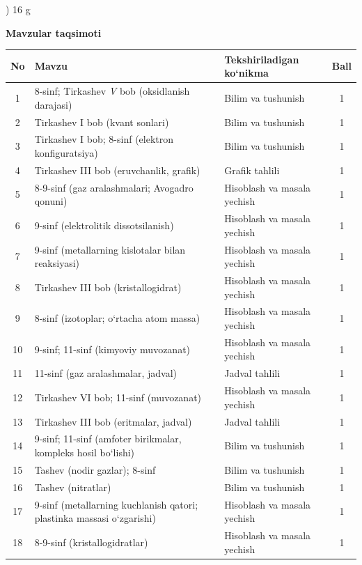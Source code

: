 \documentclass[11pt,a4paper]{article}
\begin{document}
) 16 g\par
\par\bigskip\noindent\textbf{Mavzular taqsimoti}\par\smallskip
{\small\noindent\begin{longtable}{|c|p{7.2cm}|p{5.4cm}|c|}\hline \textbf{No} & \textbf{Mavzu} & \textbf{Tekshiriladigan ko`nikma} & \textbf{Ball}\\\hline
1 & 8-sinf; Tirkashev \textit{V} bob (oksidlanish darajasi) & Bilim va tushunish & 1\\\hline
2 & Tirkashev I bob (kvant sonlari) & Bilim va tushunish & 1\\\hline
3 & Tirkashev I bob; 8-sinf (elektron konfiguratsiya) & Bilim va tushunish & 1\\\hline
4 & Tirkashev III bob (eruvchanlik, grafik) & Grafik tahlili & 1\\\hline
5 & 8-9-sinf (gaz aralashmalari; Avogadro qonuni) & Hisoblash va masala yechish & 1\\\hline
6 & 9-sinf (elektrolitik dissotsilanish) & Hisoblash va masala yechish & 1\\\hline
7 & 9-sinf (metallarning kislotalar bilan reaksiyasi) & Hisoblash va masala yechish & 1\\\hline
8 & Tirkashev III bob (kristallogidrat) & Hisoblash va masala yechish & 1\\\hline
9 & 8-sinf (izotoplar; o`rtacha atom massa) & Hisoblash va masala yechish & 1\\\hline
10 & 9-sinf; 11-sinf (kimyoviy muvozanat) & Hisoblash va masala yechish & 1\\\hline
11 & 11-sinf (gaz aralashmalar, jadval) & Jadval tahlili & 1\\\hline
12 & Tirkashev VI bob; 11-sinf (muvozanat) & Hisoblash va masala yechish & 1\\\hline
13 & Tirkashev III bob (eritmalar, jadval) & Jadval tahlili & 1\\\hline
14 & 9-sinf; 11-sinf (amfoter birikmalar, kompleks hosil bo`lishi) & Bilim va tushunish & 1\\\hline
15 & Tashev (nodir gazlar); 8-sinf & Bilim va tushunish & 1\\\hline
16 & Tashev (nitratlar) & Bilim va tushunish & 1\\\hline
17 & 9-sinf (metallarning kuchlanish qatori; plastinka massasi o`zgarishi) & Hisoblash va masala yechish & 1\\\hline
18 & 8-9-sinf (kristallogidratlar) & Hisoblash va masala yechish & 1\\\hline

\end{longtable}}
\end{document}
